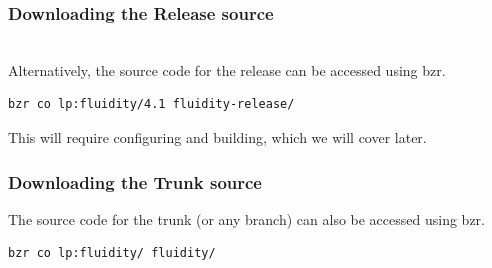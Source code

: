 \documentclass[12pt]{beamer}
\begin{document}
\begin{frame}[fragile]
        \frametitle{Downloading the Release source}
\lstset{language=bash}
{}
\\ Alternatively, the source code for the release can be accessed using bzr.
\begin{lstlisting}[language=bash,basicstyle=\ttfamily]
bzr co lp:fluidity/4.1 fluidity-release/
\end{lstlisting}    
This will require configuring and building, which we will cover later.
\end{frame}

\begin{frame}[fragile]
        \frametitle{Downloading the Trunk source}
\lstset{language=bash}
The source code for the trunk (or any branch) can also be accessed using bzr.
\begin{lstlisting}[language=bash,basicstyle=\ttfamily]
bzr co lp:fluidity/ fluidity/
\end{lstlisting}    
\end{frame}
\end{document}
